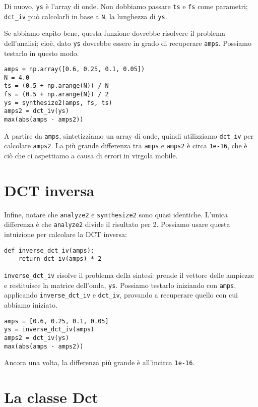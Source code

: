 \documentclass[12pt,a4paper]{book}
\begin{document}
Di nuovo, {\tt ys} è l'array di onde. Non dobbiamo passare {\tt ts} e {\tt fs} come parametri; \verb"dct_iv" può calcolarli in base a {\tt N}, la lunghezza di {\tt ys}.

Se abbiamo capito bene, questa funzione dovrebbe risolvere il problema dell'analisi; cioè, dato {\tt ys} dovrebbe essere in grado di recuperare {\tt amps}. Possiamo testarlo in questo modo.

\begin{verbatim} 
amps = np.array([0.6, 0.25, 0.1, 0.05])
N = 4.0
ts = (0.5 + np.arange(N)) / N
fs = (0.5 + np.arange(N)) / 2
ys = synthesize2(amps, fs, ts)
amps2 = dct_iv(ys)
max(abs(amps - amps2))
 \end{verbatim} 

A partire da {\tt amps}, sintetizziamo un array di onde, quindi utilizziamo \verb"dct_iv" per calcolare {\tt amps2}. La più grande differenza tra {\tt amps} e {\tt amps2} è circa {\tt 1e-16}, che è ciò che ci aspettiamo a causa di errori in virgola mobile.

\section{DCT inversa} 

Infine, notare che {\tt analyze2} e {\tt synthesize2} sono quasi identiche. L'unica differenza è che {\tt analyze2} divide il risultato per 2. Possiamo usare questa intuizione per calcolare la DCT inversa:

\begin{verbatim} 
def inverse_dct_iv(amps):
    return dct_iv(amps) * 2
 \end{verbatim} 

\verb"inverse_dct_iv" risolve il problema della sintesi: prende il vettore delle ampiezze e restituisce la matrice dell'onda, {\tt ys}. Possiamo testarlo iniziando con {\tt amps}, applicando \verb"inverse_dct_iv" e \verb"dct_iv", provando a recuperare quello con cui abbiamo iniziato.

\begin{verbatim} 
amps = [0.6, 0.25, 0.1, 0.05]
ys = inverse_dct_iv(amps)
amps2 = dct_iv(ys)
max(abs(amps - amps2))
 \end{verbatim} 

Ancora una volta, la differenza più grande è all'incirca {\tt 1e-16}.

\section{La classe Dct} 
\end{document}
